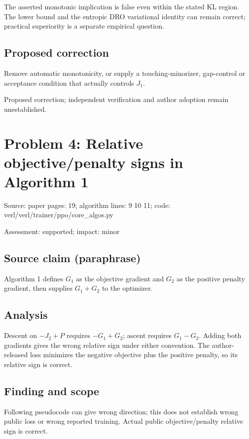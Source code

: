 \documentclass[11pt]{article}
\begin{document}
The asserted monotonic implication is false even within the stated KL region. The lower bound and the entropic DRO variational identity can remain correct; practical superiority is a separate empirical question.

\subsection*{Proposed correction}

Remove automatic monotonicity, or supply a touching-minorizer, gap-control or acceptance condition that actually controls \(J_1\).

Proposed correction; independent verification and author adoption remain unestablished.

\section*{Problem 4: Relative objective/penalty signs in Algorithm 1}

Source: paper pages: 19; algorithm lines: 9 10 11; code: verl/verl/trainer/ppo/core\_algos.py

Assessment: supported; impact: minor

\subsection*{Source claim (paraphrase)}

Algorithm 1 defines \(G_1\) as the objective gradient and \(G_2\) as the positive penalty gradient, then supplies \(G_1+G_2\) to the optimizer.

\subsection*{Analysis}

Descent on \(-J_2+P\) requires \(-G_1+G_2\); ascent requires \(G_1-G_2\). Adding both gradients gives the wrong relative sign under either convention. The author-released loss minimizes the negative objective plus the positive penalty, so its relative sign is correct.

\subsection*{Finding and scope}

Following pseudocode can give wrong direction; this does not establish wrong public loss or wrong reported training. Actual public objective/penalty relative sign is correct.
\end{document}
